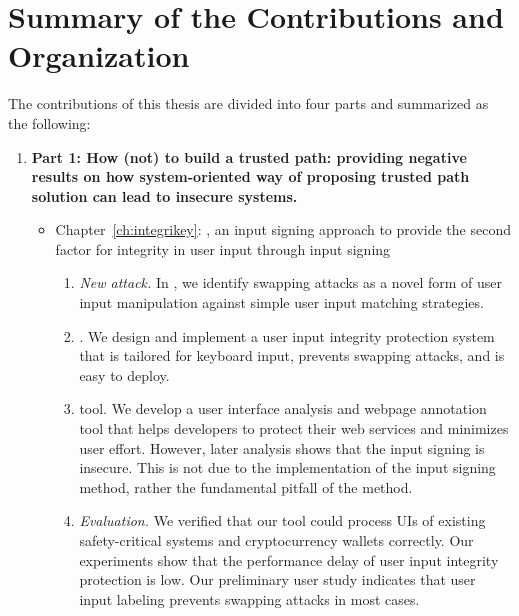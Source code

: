 \section{Summary of the Contributions and Organization}

The contributions of this thesis are divided into four parts and summarized as the following:

\begin{enumerate}[leftmargin=*]
  
  \item[] \textbf{Part 1: How (not) to build a trusted path: providing negative results on how system-oriented way of proposing trusted path solution can lead to insecure systems.}
  
  \begin{itemize}
  \item Chapter~\ref{ch:integrikey}: \integrikey, an input signing approach to provide the second factor for integrity in user input through input signing

\begin{enumerate}
    \item \emph{New attack.} In \integrikey, we identify swapping attacks as a novel form of user input manipulation against simple user input matching strategies.
    \item \integrikey. We design and implement a user input integrity protection system that is tailored for keyboard input, prevents swapping attacks, and is easy to deploy.
    \item \integrikey{} tool. We develop a user interface analysis and webpage annotation tool that helps developers to protect their web services and minimizes user effort. However, later analysis shows that the input signing is insecure. This is not due to the implementation of the input signing method, rather the fundamental pitfall of the method.
    \item \emph{Evaluation.} We verified that our tool could process UIs of existing safety-critical systems and cryptocurrency wallets correctly. Our experiments show that the performance delay of \integrikey user input integrity protection is low. Our preliminary user study indicates that user input labeling prevents swapping attacks in most cases.
\end{enumerate}


\end{itemize}
\end{enumerate}
